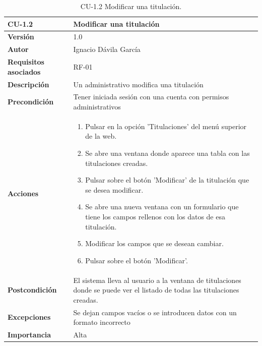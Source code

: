 \begin{table}[p]
	\centering
	\begin{tabularx}{\linewidth}{ p{} p{} }
		\toprule
		\textbf{CU-1.2}    & \textbf{Modificar una titulación}\\
		\toprule
		\textbf{Versión}              & 1.0    \\
		\textbf{Autor}                & Ignacio Dávila García \\
		\textbf{Requisitos asociados} & RF-01 \\
		\textbf{Descripción}          & Un administrativo modifica una titulación \\
		\textbf{Precondición}         & Tener iniciada sesión con una cuenta con permisos administrativos \\
		\textbf{Acciones}             &
		\begin{enumerate}
			\def\labelenumi{\arabic{enumi}.}
			\tightlist
			\item Pulsar en la opción 'Titulaciones' del menú superior de la web.
			\item Se abre una ventana donde aparece una tabla con las titulaciones creadas.
			\item Pulsar sobre el botón 'Modificar' de la titulación que se desea modificar.
			\item Se abre una nueva ventana con un formulario que tiene los campos rellenos con los datos de esa titulación.
			\item Modificar los campos que se desean cambiar.
			\item Pulsar sobre el botón 'Modificar'.
		\end{enumerate}\\
		\textbf{Postcondición}        & El sistema lleva al usuario a la ventana de titulaciones donde se puede ver el listado de todas las titulaciones creadas. \\
		\textbf{Excepciones}          & Se dejan campos vacíos o se introducen datos con un formato incorrecto \\
		\textbf{Importancia}          & Alta \\
		\bottomrule
	\end{tabularx}
	\caption{CU-1.2 Modificar una titulación.}
\end{table}

